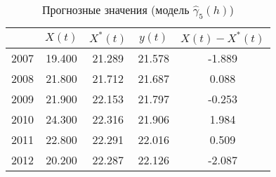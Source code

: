 \begin{table}[ht]
\centering
\begin{tabular}{r|cccc}
  \hline
 & $X(t)$ & $X^{*}(t)$ & $y(t)$ & $ X(t) - X^{*}(t) $ \\ 
  \hline
2007 & 19.400 & 21.289 & 21.578 & -1.889 \\ 
  2008 & 21.800 & 21.712 & 21.687 & 0.088 \\ 
  2009 & 21.900 & 22.153 & 21.797 & -0.253 \\ 
  2010 & 24.300 & 22.316 & 21.906 & 1.984 \\ 
  2011 & 22.800 & 22.291 & 22.016 & 0.509 \\ 
  2012 & 20.200 & 22.287 & 22.126 & -2.087 \\ 
   \hline
\end{tabular}
\caption{Прогнозные значения (модель $ \widehat{\gamma}_5(h) $)} 
\label{table:sph-fit-adapt-prediction}
\end{table}
